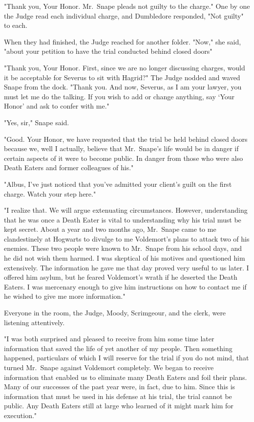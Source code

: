 "Thank you, Your Honor. Mr.~Snape pleads not guilty to the charge." One by one the Judge read each individual charge, and Dumbledore responded, "Not guilty" to each.

When they had finished, the Judge reached for another folder. "Now," she said, "about your petition to have the trial conducted behind closed doors{\el}"

"Thank you, Your Honor. First, since we are no longer discussing charges, would it be acceptable for Severus to sit with Hagrid?" The Judge nodded and waved Snape from the dock. "Thank you. And now, Severus, as I am your lawyer, you must let me do the talking. If you wish to add or change anything, say `Your Honor' and ask to confer with me."

"Yes, sir," Snape said.

"Good. Your Honor, we have requested that the trial be held behind closed doors because we, well I actually, believe that Mr.~Snape's life would be in danger if certain aspects of it were to become public. In danger from those who were also Death Eaters and former colleagues of his."

"Albus, I've just noticed that you've admitted your client's guilt on the first charge. Watch your step here."

"I realize that. We will argue extenuating circumstances. However, understanding that he was once a Death Eater is vital to understanding why his trial must be kept secret. About a year and two months ago, Mr.~Snape came to me clandestinely at Hogwarts to divulge to me Voldemort's plans to attack two of his enemies. These two people were known to Mr.~Snape from his school days, and he did not wish them harmed. I was skeptical of his motives and questioned him extensively. The information he gave me that day proved very useful to us later. I offered him asylum, but he feared Voldemort's wrath if he deserted the Death Eaters. I was mercenary enough to give him instructions on how to contact me if he wished to give me more information."

Everyone in the room, the Judge, Moody, Scrimgeour, and the clerk, were listening attentively.

"I was both surprised and pleased to receive from him some time later information that saved the life of yet another of my people. Then something happened, particulars of which I will reserve for the trial if you do not mind, that turned Mr.~Snape against Voldemort completely. We began to receive information that enabled us to eliminate many Death Eaters and foil their plans. Many of our successes of the past year were, in fact, due to him. Since this is information that must be used in his defense at his trial, the trial cannot be public. Any Death Eaters still at large who learned of it might mark him for execution."

